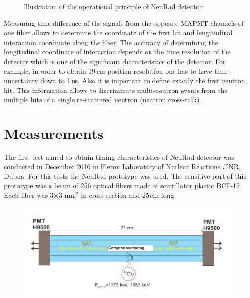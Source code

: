 \documentclass{webofc}
\begin{document}
\begin{figure}[h]
	\caption{Illustration of the operational principle of NeuRad detector}
	\label{ris:neuradPrinciple}
\end{figure}

Measuring time difference of the signals from the opposite MAPMT channels of one fiber allows to determine the coordinate of the first hit and longitudinal interaction coordinate along the fiber. The accuracy of determining the longitudinal coordinate of interaction depends on the time resolution of the detector which is one of the significant characteristics of the detector. %
For example, in order to obtain 19\,cm position resolution one has to have time-uncertainty down to 1\,ns. Also it is important to define exactly the first neutron hit. This information allows to discriminate multi-neutron events from the multiple hits of a single re-scattered neutron (neutron cross-talk).
\section{Measurements}
The first test aimed to obtain timing characteristics of NeuRad detector was conducted in December 2016 in Flerov Laboratory of Nuclear Reactions JINR, Dubna. For this tests the NeuRad prototype was used. The sensitive part of this prototype was a beam of 256 optical fibers made of scintillator plastic BCF-12. Each fiber was  3$\times$3 mm$^2$ in cross section and 25\,cm long. 
\begin{figure}[h]
	\centering
	\includegraphics[width=1\linewidth]{NeuRadexperiment.png}
	\label{ris:neuradexp}
\end{figure}
\end{document}
